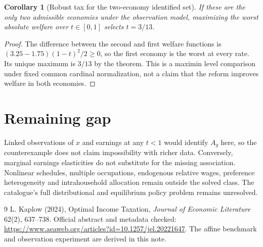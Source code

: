 \documentclass[11pt]{article}
\newtheorem{corollary}{Corollary}
\theoremstyle{definition}
\begin{document}
\begin{corollary}[Robust tax for the two-economy identified set]
If these are the only two admissible economies under the observation model, maximizing the worst absolute welfare over $t\in[0,1]$ selects $t=3/13$.
\end{corollary}
\begin{proof}
The difference between the second and first welfare functions is $(3.25-1.75)(1-t)^2/2\geq0$, so the first economy is the worst at every rate. Its unique maximum is $3/13$ by the theorem. This is a maximin level comparison under fixed common cardinal normalization, not a claim that the reform improves welfare in both economies.
\end{proof}

\section*{Remaining gap}
Linked observations of $x$ and earnings at any $t<1$ would identify $A_g$ here, so the counterexample does not claim impossibility with richer data. Conversely, marginal earnings elasticities do not substitute for the missing association. Nonlinear schedules, multiple occupations, endogenous relative wages, preference heterogeneity and intrahousehold allocation remain outside the solved class. The catalogue's full distributional and equilibrium policy problem remains unresolved.
\begin{thebibliography}{9}
 L. Kaplow (2024), Optimal Income Taxation, \emph{Journal of Economic Literature} 62(2), 637--738. Official abstract and metadata checked: \url{https://www.aeaweb.org/articles?id=10.1257/jel.20221647}. The affine benchmark and observation experiment are derived in this note.
\end{thebibliography}
\end{document}
